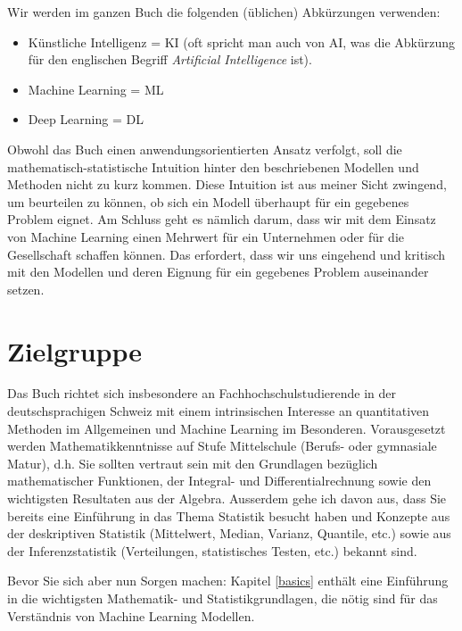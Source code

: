 \documentclass[
]{book}
\providecommand{\tightlist}{%
  \setlength{\itemsep}{0pt}\setlength{\parskip}{0pt}}
\begin{document}
Wir werden im ganzen Buch die folgenden (üblichen) Abkürzungen verwenden:

\begin{itemize}
\tightlist
\item
  Künstliche Intelligenz = KI (oft spricht man auch von AI, was die Abkürzung für den englischen Begriff \emph{Artificial Intelligence} ist).
\item
  Machine Learning = ML
\item
  Deep Learning = DL
\end{itemize}

Obwohl das Buch einen anwendungsorientierten Ansatz verfolgt, soll die mathematisch-statistische Intuition hinter den beschriebenen Modellen und Methoden nicht zu kurz kommen. Diese Intuition ist aus meiner Sicht zwingend, um beurteilen zu können, ob sich ein Modell überhaupt für ein gegebenes Problem eignet. Am Schluss geht es nämlich darum, dass wir mit dem Einsatz von Machine Learning einen Mehrwert für ein Unternehmen oder für die Gesellschaft schaffen können. Das erfordert, dass wir uns eingehend und kritisch mit den Modellen und deren Eignung für ein gegebenes Problem auseinander setzen.

\hypertarget{zielgruppe}{%
\section*{Zielgruppe}\label{zielgruppe}}

Das Buch richtet sich insbesondere an Fachhochschulstudierende in der deutschsprachigen Schweiz mit einem intrinsischen Interesse an quantitativen Methoden im Allgemeinen und Machine Learning im Besonderen. Vorausgesetzt werden Mathematikkenntnisse auf Stufe Mittelschule (Berufs- oder gymnasiale Matur), d.h. Sie sollten vertraut sein mit den Grundlagen bezüglich mathematischer Funktionen, der Integral- und Differentialrechnung sowie den wichtigsten Resultaten aus der Algebra. Ausserdem gehe ich davon aus, dass Sie bereits eine Einführung in das Thema Statistik besucht haben und Konzepte aus der deskriptiven Statistik (Mittelwert, Median, Varianz, Quantile, etc.) sowie aus der Inferenzstatistik (Verteilungen, statistisches Testen, etc.) bekannt sind.

Bevor Sie sich aber nun Sorgen machen: Kapitel \ref{basics} enthält eine Einführung in die wichtigsten Mathematik- und Statistikgrundlagen, die nötig sind für das Verständnis von Machine Learning Modellen.
\end{document}
